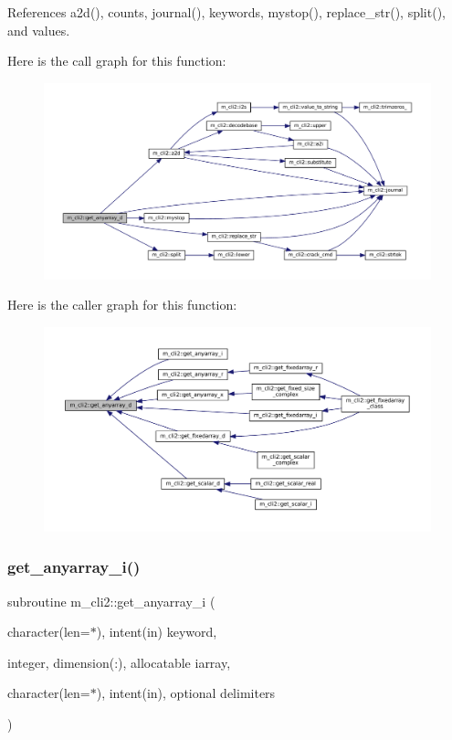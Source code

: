 References a2d(), counts, journal(), keywords, mystop(), replace\+\_\+str(), split(), and values.

Here is the call graph for this function\+:
\nopagebreak
\begin{figure}[H]
\begin{center}
\leavevmode
\includegraphics[width=350pt]{namespacem__cli2_aaede1f28172778cf45f4b6c04967bbbd_cgraph}
\end{center}
\end{figure}
Here is the caller graph for this function\+:\nopagebreak
\begin{figure}[H]
\begin{center}
\leavevmode
\includegraphics[width=350pt]{namespacem__cli2_aaede1f28172778cf45f4b6c04967bbbd_icgraph}
\end{center}
\end{figure}
\mbox{\label{namespacem__cli2_ad314315dd5c93abff5168265f5ff0e4e}} 
\subsubsection{\texorpdfstring{get\+\_\+anyarray\+\_\+i()}{get\_anyarray\_i()}}
{\footnotesize\ttfamily subroutine m\+\_\+cli2\+::get\+\_\+anyarray\+\_\+i (\begin{DoxyParamCaption}\item[{character(len=$\ast$), intent(in)}]{keyword,  }\item[{integer, dimension(\+:), allocatable}]{iarray,  }\item[{character(len=$\ast$), intent(in), optional}]{delimiters }\end{DoxyParamCaption})\hspace{0.3cm}{\ttfamily [private]}}



